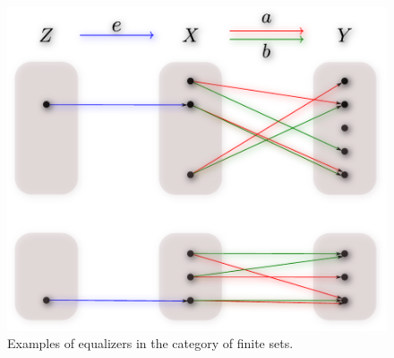 \begin{frame}
\begin{figure}
\noindent\includegraphics[width=0.8\framewidth]{fig/equalizer.pdf}
\caption{Examples of equalizers in the category of finite sets.}
\label{fig:equalizer}
\end{figure}
\end{frame}
